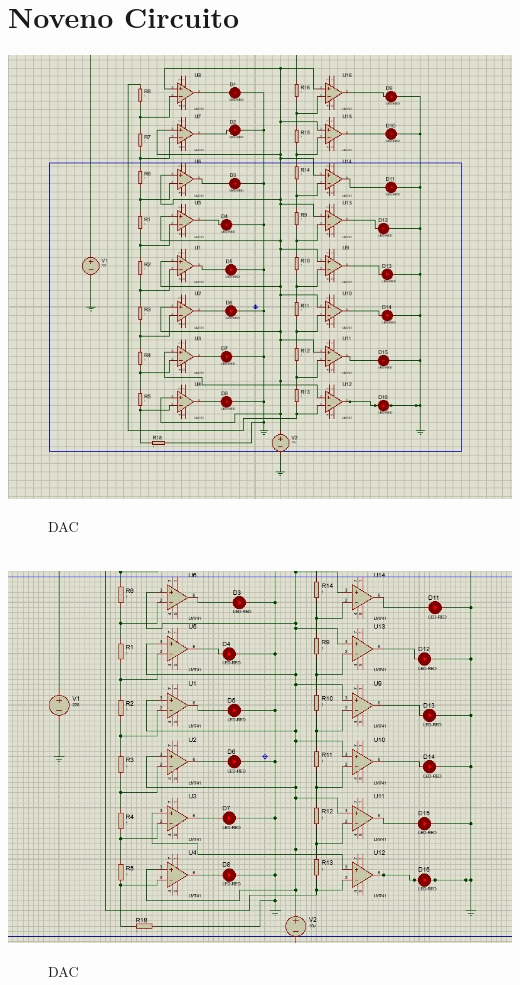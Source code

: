 \documentclass[10pt,a4paper]{article}
\begin{document}
\section{Noveno Circuito}
\begin{center}
 \includegraphics[scale=0.3]{16.png}
 \begin{figure}[hbtp]
 \caption{DAC}
 \centering
 \end{figure}\\
  \includegraphics[scale=0.3]{17.png}
 \begin{figure}[hbtp]
 \caption{DAC}
 \centering
 \end{figure} 
\end{center}
\end{document}
